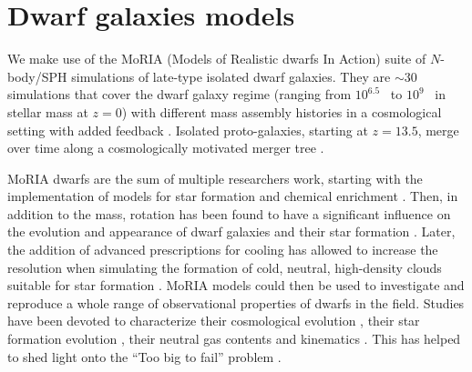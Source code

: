 
%

\section{Dwarf galaxies models}
\label{sec:dwarf_models}
We make use of the MoRIA (Models of Realistic dwarfs In Action) suite of $N$-body/SPH simulations of late-type isolated dwarf galaxies.
They are $\sim30$ simulations that cover the dwarf galaxy regime (ranging from $10^{6.5}$~\Msun{} to $10^9$~\Msun{} in stellar mass at $z=0$) with different mass assembly histories in a cosmological setting with added \popiii{} feedback \citep{Verbeke2017}.
Isolated proto-galaxies, starting at $z = 13.5$, merge over time along a cosmologically motivated merger tree \citep{Cloet-Osselaer2014}.

MoRIA dwarfs are the sum of multiple researchers work, starting with the implementation of models for star formation and chemical enrichment \citep{Valcke2008}.
Then, in addition to the mass, rotation has been found to have a significant influence on the evolution and appearance of dwarf galaxies and their star formation \citep{Schroyen2011}.
Later, the addition of advanced prescriptions for cooling has allowed to increase the resolution when simulating the formation of cold, neutral, high-density clouds suitable for star formation \citep{DeRijcke2013}. %
MoRIA models could then be used to investigate and reproduce a whole range of observational properties of dwarfs in the field.
Studies have been devoted to characterize their cosmological evolution \citep{Cloet-Osselaer2012}, their star formation evolution \citep{Verbeke2015}, their neutral gas contents and kinematics \citep{Koleva2014}.
This has helped to shed light onto the ``Too big to fail'' problem \citep{Verbeke2017}.


